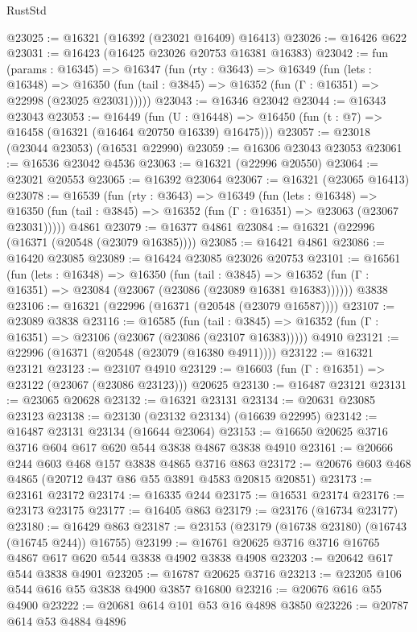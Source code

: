 \begin{lexlean}{RustStd}
\begin{coremodule}
@23025 := @16321 (@16392 (@23021 @16409) @16413)
@23026 := @16426 @622
@23031 := @16423 (@16425 @23026 @20753 @16381 @16383)
@23042 := fun (params : @16345) =>
  @16347
    (fun (rty : @3643) =>
    @16349
      (fun (lets : @16348) =>
      @16350 (fun (tail : @3845) => @16352 (fun (Γ : @16351) => @22998 (@23025 @23031)))))
@23043 := @16346 @23042
@23044 := @16343 @23043
@23053 := @16449
    (fun (U : @16448) => @16450 (fun (t : @7) => @16458 (@16321 (@16464 @20750 @16339) @16475)))
@23057 := @23018 (@23044 @23053) (@16531 @22990)
@23059 := @16306 @23043 @23053
@23061 := @16536 @23042 @4536
@23063 := @16321 (@22996 @20550)
@23064 := @23021 @20553
@23065 := @16392 @23064
@23067 := @16321 (@23065 @16413)
@23078 := @16539
    (fun (rty : @3643) =>
    @16349
      (fun (lets : @16348) =>
      @16350 (fun (tail : @3845) => @16352 (fun (Γ : @16351) => @23063 (@23067 @23031)))))
    @4861
@23079 := @16377 @4861
@23084 := @16321 (@22996 (@16371 (@20548 (@23079 @16385))))
@23085 := @16421 @4861
@23086 := @16420 @23085
@23089 := @16424 @23085 @23026 @20753
@23101 := @16561
    (fun (lets : @16348) =>
    @16350
      (fun (tail : @3845) =>
      @16352 (fun (Γ : @16351) => @23084 (@23067 (@23086 (@23089 @16381 @16383))))))
    @3838
@23106 := @16321 (@22996 (@16371 (@20548 (@23079 @16587))))
@23107 := @23089 @3838
@23116 := @16585
    (fun (tail : @3845) => @16352 (fun (Γ : @16351) => @23106 (@23067 (@23086 (@23107 @16383)))))
    @4910
@23121 := @22996 (@16371 (@20548 (@23079 (@16380 @4911))))
@23122 := @16321 @23121
@23123 := @23107 @4910
@23129 := @16603 (fun (Γ : @16351) => @23122 (@23067 (@23086 @23123))) @20625
@23130 := @16487 @23121
@23131 := @23065 @20628
@23132 := @16321 @23131
@23134 := @20631 @23085 @23123
@23138 := @23130 (@23132 @23134) (@16639 @22995)
@23142 := @16487 @23131 @23134 (@16644 @23064)
@23153 := @16650 @20625 @3716 @3716 @604 @617 @620 @544 @3838 @4867 @3838 @4910
@23161 := @20666 @244 @603 @468 @157 @3838 @4865 @3716 @863
@23172 := @20676 @603 @468 @4865 (@20712 @437 @86 @55 @3891 @4583 @20815 @20851)
@23173 := @23161 @23172
@23174 := @16335 @244
@23175 := @16531 @23174
@23176 := @23173 @23175
@23177 := @16405 @863
@23179 := @23176 (@16734 @23177)
@23180 := @16429 @863
@23187 := @23153 (@23179 (@16738 @23180) (@16743 (@16745 @244)) @16755)
@23199 := @16761 @20625 @3716 @3716 @16765 @4867 @617 @620 @544 @3838 @4902 @3838 @4908
@23203 := @20642 @617 @544 @3838 @4901
@23205 := @16787 @20625 @3716
@23213 := @23205 @106 @544 @616 @55 @3838 @4900 @3857 @16800
@23216 := @20676 @616 @55 @4900
@23222 := @20681 @614 @101 @53 @16 @4898 @3850
@23226 := @20787 @614 @53 @4884 @4896

\end{coremodule}
\end{lexlean}
